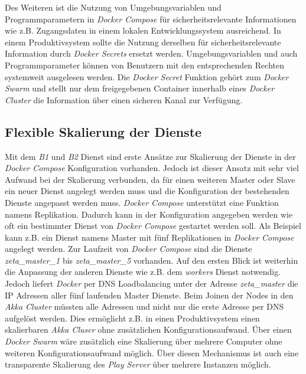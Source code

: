 Des Weiteren ist die Nutzung von Umgebungsvariablen und Programmparametern in \textit{Docker Compose} für sicherheitsrelevante Informationen wie z.B. Zugangsdaten in einem lokalen Entwicklungssystem ausreichend. In einem Produktivsystem sollte die Nutzung derselben für sicherheitsrelevante Information durch \textit{Docker Secrets} ersetzt werden. Umgebungsvariablen und auch Programmparameter können von Benutzern mit den entsprechenden Rechten systemweit ausgelesen werden. Die \textit{Docker Secret} Funktion gehört zum \textit{Docker Swarm} und stellt nur dem freigegebenen Container innerhalb eines \textit{Docker Cluster} die Information über einen sicheren Kanal zur Verfügung.

\subsection{Flexible Skalierung der Dienste}

Mit dem \textit{B1} und \textit{B2} Dienst sind erste Ansätze zur Skalierung der Dienste in der \textit{Docker Compose} Konfiguration vorhanden. Jedoch ist dieser Ansatz mit sehr viel Aufwand bei der Skalierung verbunden, da für einen weiteren Master oder Slave ein neuer Dienst angelegt werden muss und die Konfiguration der bestehenden Dienste angepasst werden muss. \textit{Docker Compose} unterstützt eine Funktion namens Replikation. Dadurch kann in der Konfiguration angegeben werden wie oft ein bestimmter Dienst von \textit{Docker Compose} gestartet werden soll. Als Beispiel kann z.B. ein Dienst namens Master mit fünf Replikationen in \textit{Docker Compose} angelegt werden. Zur Laufzeit von \textit{Docker Compose} sind die Dienste \textit{zeta\_master\_1} bis \textit{zeta\_master\_5} vorhanden. Auf den ersten Blick ist weiterhin die Anpassung der anderen Dienste wie z.B. dem \textit{workers} Dienst notwendig. Jedoch liefert \textit{Docker} per DNS Loadbalancing unter der Adresse \textit{zeta\_master} die IP Adressen aller fünf laufenden Master Dienste. Beim Joinen der Nodes in den \textit{Akka Cluster} müssten alle Adressen und nicht nur die erste Adresse per DNS aufgelöst werden. Dies ermöglicht z.B. in einen Produktivsystem einen skalierbaren \textit{Akka Cluser} ohne zusätzlichen Konfigurationsaufwand. Über einen \textit{Docker Swarm} wäre zusätzlich eine Skalierung über mehrere Computer ohne weiteren Konfigurationsaufwand möglich. Über diesen Mechanismus ist auch eine transparente Skalierung des \textit{Play Server} über mehrere Instanzen möglich.  

